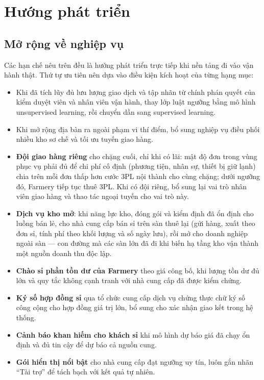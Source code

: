\section{Hướng phát triển}

\subsection{Mở rộng về nghiệp vụ}

Các hạn chế nêu trên đều là hướng phát triển trực tiếp khi nền tảng đi vào vận hành thật. Thứ tự ưu tiên nên dựa vào điều kiện kích hoạt của từng hạng mục:
\begin{itemize}
    \item Khi đã tích lũy đủ lưu lượng giao dịch và tập nhãn từ chính phán quyết của kiểm duyệt viên và nhân viên vận hành, thay lớp luật ngưỡng bằng mô hình unsupervised learning, rồi chuyển dần sang supervised learning.
    \item Khi mở rộng địa bàn ra ngoài phạm vi thí điểm, bổ sung nghiệp vụ điều phối nhiều kho sơ chế và tối ưu tuyến giao hàng.
    \item \textbf{Đội giao hàng riêng} cho chặng cuối, chỉ khi có lãi: mật độ đơn trong vùng phục vụ phải đủ để chi phí cố định (phương tiện, nhân sự, thiết bị giữ lạnh) chia trên mỗi đơn thấp hơn cước 3PL nội thành cho cùng chặng; dưới ngưỡng đó, Farmery tiếp tục thuê 3PL. Khi có đội riêng, bổ sung lại vai trò nhân viên giao hàng và thao tác ngoại tuyến cho vai trò này.
    \item \textbf{Dịch vụ kho mở}: khi năng lực kho, đóng gói và kiểm định đã ổn định cho luồng bán lẻ, cho nhà cung cấp bán sỉ trên sàn thuê lại (gửi hàng, xuất theo đơn sỉ, tính phí theo khối lượng và số ngày lưu), rồi mở cho doanh nghiệp ngoài sàn --- con đường mà các sàn lớn đã đi khi biến hạ tầng kho vận thành một nguồn doanh thu độc lập.
    \item \textbf{Chào sỉ phần tồn dư của Farmery} theo giá công bố, khi lượng tồn dư đủ lớn và quy tắc không cạnh tranh với nhà cung cấp đã được kiểm chứng.
    \item \textbf{Ký số hợp đồng sỉ} qua tổ chức cung cấp dịch vụ chứng thực chữ ký số công cộng cho hợp đồng giá trị lớn, bổ sung cho xác nhận giao kết trong hệ thống.
    \item \textbf{Cảnh báo khan hiếm cho khách sỉ} khi mô hình dự báo giá đã chạy ổn định và đủ tin cậy để dự báo cả nguồn cung.
    \item \textbf{Gói hiển thị nổi bật} cho nhà cung cấp đạt ngưỡng uy tín, luôn gắn nhãn ``Tài trợ'' để tách bạch với kết quả tự nhiên.

\end{itemize}
